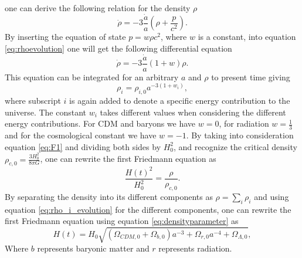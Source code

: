 one can derive the following relation for the density $\rho$
\begin{equation}\label{eq:rhoevolution}
    \dot{\rho}=-3\frac{\dot{a}}{a}(\rho+\frac{p}{c^2}).
\end{equation}
By inserting the equation of state $p=w\rho c^2$, where $w$ is a constant,
into equation \ref{eq:rhoevolution} one will get the following differential
equation
\begin{equation}
    \dot{\rho}=-3\frac{\dot{a}}{a}(1+w)\rho.
\end{equation}
This equation can be integrated for an arbitrary $a$ and $\rho$ to present time
giving
\begin{equation}\label{eq:rho_i_evolution}
    \rho_i=\rho_{i,0}a^{-3(1+w_i)},
\end{equation}
where subscript $i$ is again added to denote a specific energy contribution to
the universe. The constant $w_i$ takes different values when considering the
different energy contributions. For CDM and baryons we have $w=0$, for
radiation $w=\frac{1}{3}$ and for the cosmological constant we have $w=-1$. By
taking into consideration equation \ref{eq:F1} and dividing both sides by $H_0^2$,
and recognize the critical density $\rho_{c,0}=\frac{3H_0^2}{8\pi G}$, one can
rewrite the first Friedmann equation as
\begin{equation}
    \frac{H(t)^2}{H_0^2}=\frac{\rho}{\rho_{c,0}}.
\end{equation}
By separating the density into its different components as $\rho=\sum_i\rho_i$
and using equation \ref{eq:rho_i_evolution} for the different components, one can rewrite
the first Friedmann equation using equation \ref{eq:densityparameter} as
\begin{equation}
    H(t)=H_0\sqrt{(\Omega_{CDM,0} + \Omega_{b,0})a^{-3} + \Omega_{r,0}a^{-4} + \Omega_{\Lambda,0}},
\end{equation}
Where $b$ represents baryonic matter and $r$ represents radiation.

